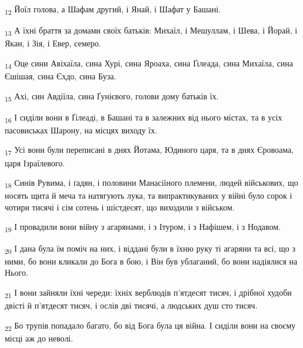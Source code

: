\begin{tcolorbox}
\textsubscript{12} Йоїл голова, а Шафам другий, і Янай, і Шафат у Башані.
\end{tcolorbox}
\begin{tcolorbox}
\textsubscript{13} А їхні браття за домами своїх батьків: Михаїл, і Мешуллам, і Шева, і Йорай, і Якан, і Зія, і Евер, семеро.
\end{tcolorbox}
\begin{tcolorbox}
\textsubscript{14} Оце сини Авіхаїла, сина Хурі, сина Яроаха, сина Ґілеада, сина Михаїла, сина Єшішая, сина Єхдо, сина Буза.
\end{tcolorbox}
\begin{tcolorbox}
\textsubscript{15} Ахі, син Авдіїла, сина Ґунієвого, голови дому батьків їх.
\end{tcolorbox}
\begin{tcolorbox}
\textsubscript{16} І сиділи вони в Ґілеаді, в Башані та в залежних від нього містах, та в усіх пасовиськах Шарону, на місцях виходу їх.
\end{tcolorbox}
\begin{tcolorbox}
\textsubscript{17} Усі вони були переписані в днях Йотама, Юдиного царя, та в днях Єровоама, царя Ізраїлевого.
\end{tcolorbox}
\begin{tcolorbox}
\textsubscript{18} Синів Рувима, і ґадян, і половини Манасіїного племени, людей військових, що носять щита й меча та натягують лука, та випрактикуваних у війні було сорок і чотири тисячі і сім сотень і шістдесят, що виходили з військом.
\end{tcolorbox}
\begin{tcolorbox}
\textsubscript{19} І провадили вони війну з агарянами, і з Ітуром, і з Нафішем, і з Нодавом.
\end{tcolorbox}
\begin{tcolorbox}
\textsubscript{20} І дана була їм поміч на них, і віддані були в їхню руку ті агаряни та всі, що з ними, бо вони кликали до Бога в бою, і Він був ублаганий, бо вони надіялися на Нього.
\end{tcolorbox}
\begin{tcolorbox}
\textsubscript{21} І вони зайняли їхні череди: їхніх верблюдів п'ятдесят тисяч, і дрібної худоби двісті й п'ятдесят тисяч, і ослів дві тисячі, а людських душ сто тисяч.
\end{tcolorbox}
\begin{tcolorbox}
\textsubscript{22} Бо трупів попадало багато, бо від Бога була ця війна. І сиділи вони на своєму місці аж до неволі.
\end{tcolorbox}
